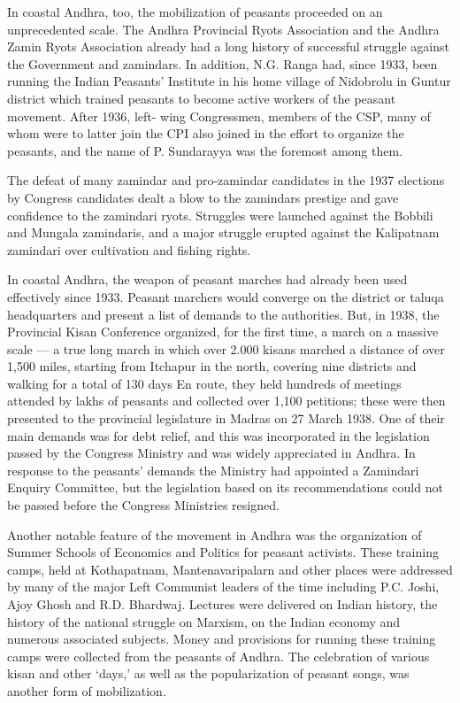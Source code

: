 \begin{multicols}{2}
In coastal Andhra, too, the mobilization of peasants proceeded on an unprecedented scale. The Andhra Provincial Ryots Association and the Andhra Zamin Ryots Association already had a long history of successful struggle against the Government and zamindars. In addition, N.G. Ranga had, since 1933, been running the Indian Peasants' Institute in his home village of Nidobrolu in Guntur district which trained peasants to become active workers of the peasant movement. After 1936, left- wing Congressmen, members of the CSP, many of whom were to latter join the CPI also joined in the effort to organize the peasants, and the name of P. Sundarayya was the foremost among them.

The defeat of many zamindar and pro-zamindar candidates in the 1937 elections by Congress candidates dealt a blow to the zamindars prestige and gave confidence to the zamindari ryots. Struggles were launched against the Bobbili and Mungala zamindaris, and a major struggle erupted against the Kalipatnam zamindari over cultivation and fishing rights.

In coastal Andhra, the weapon of peasant marches had already been used effectively since 1933. Peasant marchers would converge on the district or taluqa headquarters and present a list of demands to the authorities. But, in 1938, the Provincial Kisan Conference organized, for the first time, a march on a massive scale --- a true long march in which over 2.000 kisans marched a distance of over 1,500 miles, starting from Itchapur in the north, covering nine districts and walking for a total of 130 days En route, they held hundreds of meetings attended by lakhs of peasants and collected over 1,100 petitions; these were then presented to the provincial legislature in Madras on 27 March 1938. One of their main demands was for debt relief, and this was incorporated in the legislation passed by the Congress Ministry and was widely appreciated in Andhra. In response to the peasants' demands the Ministry had appointed a Zamindari Enquiry Committee, but the legislation based on its recommendations could not be passed before the Congress Ministries resigned.

Another notable feature of the movement in Andhra was the organization of Summer Schools of Economics and Politics for peasant activists. These training camps, held at Kothapatnam, Mantenavaripalarn and other places were addressed by many of the major Left Communist leaders of the time including P.C. Joshi, Ajoy Ghosh and R.D. Bhardwaj. Lectures were delivered on Indian history, the history of the national struggle on Marxism, on the Indian economy and numerous associated subjects. Money and provisions for running these training camps were collected from the peasants of Andhra. The celebration of various kisan and other `days,' as well as the popularization of peasant songs, was another form of mobilization.


\end{multicols}
